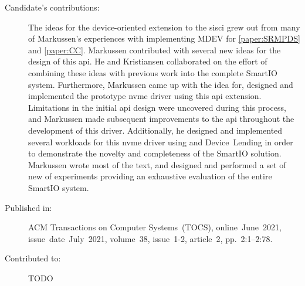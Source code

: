 \begin{description}
	\item[Candidate's contributions:]
	    The ideas for the device-oriented extension to the \gls{sisci} grew out from many of Markussen's experiences with implementing MDEV for \cref{paper:SRMPDS} and \cref{paper:CC}.
		Markussen contributed with several new ideas for the design of this \acrshort{api}.
		He and Kristiansen collaborated on the effort of combining these ideas with previous work into the complete SmartIO system. 
		Furthermore, Markussen came up with the idea for, designed and implemented the prototype \acrshort{nvme} driver using this \acrshort{api} extension. 
	    Limitations in the initial \acrshort{api} design were uncovered during this process, and Markussen made subsequent improvements to the \acrshort{api} throughout the development of this driver.
		Additionally, he designed and implemented several workloads for this \acrshort{nvme} driver using  and Device~Lending
		in order to demonstrate the novelty and completeness of the SmartIO solution.
		Markussen wrote most of the text, and designed and performed a set of new of experiments providing an exhaustive evaluation of the entire SmartIO system.
		

	\item[Published in:]
		ACM Transactions on Computer Systems~(TOCS), 
		online~June~2021,
		issue~date~July~2021, 
		volume~38, issue~1-2, article~2, pp.~2:1--2:78.

	\item[Contributed to:]
		TODO

\end{description}
